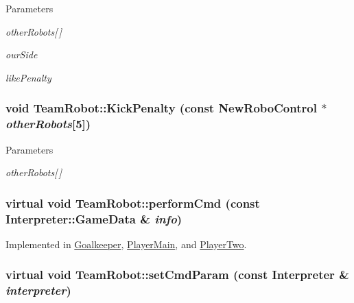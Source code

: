 \begin{DoxyParams}{Parameters}
\item[{\em otherRobots\mbox{[}$\,$\mbox{]}}]\item[{\em ourSide}]\item[{\em likePenalty}]\end{DoxyParams}
\hypertarget{classTeamRobot_ad5755055df84960c8d1a0a40efe33668}{
\subsubsection[{KickPenalty}]{\setlength{\rightskip}{0pt plus 5cm}void TeamRobot::KickPenalty (const {\bf NewRoboControl} $\ast$ {\em otherRobots}\mbox{[}5\mbox{]})}}
\label{classTeamRobot_ad5755055df84960c8d1a0a40efe33668}

\begin{DoxyParams}{Parameters}
\item[{\em otherRobots\mbox{[}$\,$\mbox{]}}]\end{DoxyParams}
\hypertarget{classTeamRobot_a9b84df51ca16a7203fdb6498ea6741da}{
\subsubsection[{performCmd}]{\setlength{\rightskip}{0pt plus 5cm}virtual void TeamRobot::performCmd (const {\bf Interpreter::GameData} \& {\em info})}}
\label{classTeamRobot_a9b84df51ca16a7203fdb6498ea6741da}


Implemented in \hyperlink{classGoalkeeper_ab850d0d2278730bebc5479f1a339a925}{Goalkeeper}, \hyperlink{classPlayerMain_af12a95c226ce973056681a138b55fb6c}{PlayerMain}, and \hyperlink{classPlayerTwo_a56d794b718c60092a324f312b8333eb9}{PlayerTwo}.

\hypertarget{classTeamRobot_a34c0fd6986c510d4025e5752b3c0e49a}{
\subsubsection[{setCmdParam}]{\setlength{\rightskip}{0pt plus 5cm}virtual void TeamRobot::setCmdParam (const {\bf Interpreter} \& {\em interpreter})}}
\label{classTeamRobot_a34c0fd6986c510d4025e5752b3c0e49a}



